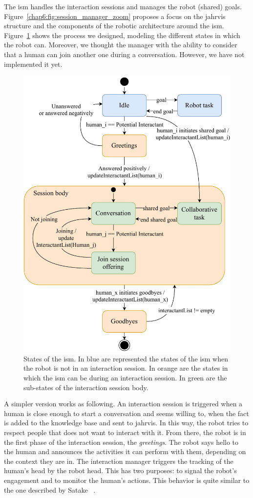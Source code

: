 \documentclass[a4paper,11pt,twoside]{StyleThese}
\begin{document}
The \acrfull{ism} handles the interaction sessions and manages the robot (shared) goals. Figure~\ref{chap6:fig:session_manager_zoom} proposes a focus on the \acrshort{jahrvis} structure and the components of the robotic architecture around the \acrshort{ism}. Figure~\ref{chap6:fig:session_manager} shows the process we designed, modeling the different states in which the robot can. Moreover, we thought the manager with the ability to consider that a human can join another one during a conversation. However, we have not implemented it yet.

\begin{figure}[!htb]
	\centering
	\includegraphics[width=0.8\linewidth]{figures/chapter2/session_manager.pdf}
	\caption{States of the \acrfull{ism}. In blue are represented the states of the \acrshort{ism} when the robot is not in an interaction session. In orange are the states in which the \acrshort{ism} can be during an interaction session. In green are the sub-states of the interaction session body.}
	\label{chap6:fig:session_manager}
\end{figure}

A simpler version works as following. An interaction session is triggered when a human is close enough to start a conversation and seems willing to, \ie when the fact   is added to the knowledge base and sent to \acrshort{jahrvis}. In this way, the robot tries to respect people that does not want to interact with it. From there, the robot is in the first phase of the interaction session, the \textit{greetings}. The robot says hello to the human and announces the activities it can perform with them, depending on the context they are in. The interaction manager triggers the tracking of the human's head by the robot head. This has two purposes: to signal the robot's engagement and to monitor the human's actions. This behavior is quite similar to the one described by Satake \etal~\cite{satake_2015_should}. 
\end{document}
